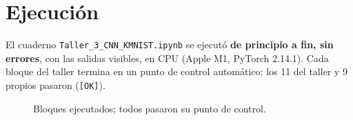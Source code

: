 \documentclass[11pt,letterpaper]{article}
\begin{document}
\section{Ejecución}

El cuaderno \texttt{Taller\_3\_CNN\_KMNIST.ipynb} se ejecutó \textbf{de principio a fin, sin errores}, con las salidas visibles, en CPU (Apple M1, PyTorch 2.14.1). Cada bloque del taller
termina en un punto de control automático; los 11 del taller y 9 propios pasaron (\texttt{[OK]}).

\begin{figure}[H]
\centering
{}
\caption{Bloques ejecutados; todos pasaron su punto de control.}
\end{figure}
\end{document}
